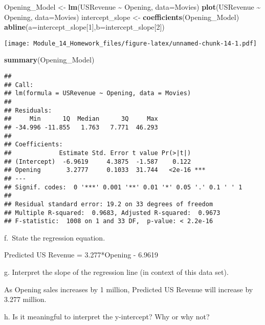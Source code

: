 \documentclass[
]{article}
\newenvironment{Shaded}{\begin{snugshade}}{\end{snugshade}}
\newcommand{\AttributeTok}[1]{\textcolor[rgb]{0.13,0.29,0.53}{#1}}
\newcommand{\DecValTok}[1]{\textcolor[rgb]{0.00,0.00,0.81}{#1}}
\newcommand{\FunctionTok}[1]{\textcolor[rgb]{0.13,0.29,0.53}{\textbf{#1}}}
\newcommand{\NormalTok}[1]{#1}
\newcommand{\OtherTok}[1]{\textcolor[rgb]{0.56,0.35,0.01}{#1}}
\newcommand{\SpecialCharTok}[1]{\textcolor[rgb]{0.81,0.36,0.00}{\textbf{#1}}}
\begin{document}
\begin{Shaded}
\begin{Highlighting}[]
\NormalTok{Opening\_Model }\OtherTok{\textless{}{-}} \FunctionTok{lm}\NormalTok{(USRevenue }\SpecialCharTok{\textasciitilde{}}\NormalTok{ Opening, }\AttributeTok{data=}\NormalTok{Movies)}
\FunctionTok{plot}\NormalTok{(USRevenue }\SpecialCharTok{\textasciitilde{}}\NormalTok{ Opening, }\AttributeTok{data=}\NormalTok{Movies)}
\NormalTok{intercept\_slope }\OtherTok{\textless{}{-}} \FunctionTok{coefficients}\NormalTok{(Opening\_Model)}
\FunctionTok{abline}\NormalTok{(}\AttributeTok{a=}\NormalTok{intercept\_slope[}\DecValTok{1}\NormalTok{],}\AttributeTok{b=}\NormalTok{intercept\_slope[}\DecValTok{2}\NormalTok{])}
\end{Highlighting}
\end{Shaded}

\texttt{[image: Module\_14\_Homework\_files/figure-latex/unnamed-chunk-14-1.pdf]}

\begin{Shaded}
\begin{Highlighting}[]
\FunctionTok{summary}\NormalTok{(Opening\_Model)}
\end{Highlighting}
\end{Shaded}

\begin{verbatim}
## 
## Call:
## lm(formula = USRevenue ~ Opening, data = Movies)
## 
## Residuals:
##     Min      1Q  Median      3Q     Max 
## -34.996 -11.855   1.763   7.771  46.293 
## 
## Coefficients:
##             Estimate Std. Error t value Pr(>|t|)    
## (Intercept)  -6.9619     4.3875  -1.587    0.122    
## Opening       3.2777     0.1033  31.744   <2e-16 ***
## ---
## Signif. codes:  0 '***' 0.001 '**' 0.01 '*' 0.05 '.' 0.1 ' ' 1
## 
## Residual standard error: 19.2 on 33 degrees of freedom
## Multiple R-squared:  0.9683, Adjusted R-squared:  0.9673 
## F-statistic:  1008 on 1 and 33 DF,  p-value: < 2.2e-16
\end{verbatim}

\hfill\break
f.~State the regression equation.

Predicted US Revenue = 3.277*Opening - 6.9619

\hfill\break
g. Interpret the slope of the regression line (in context of this data
set).

As Opening sales increases by 1 million, Predicted US Revenue will
increase by 3.277 million.

\hfill\break
h. Is it meaningful to interpret the y-intercept? Why or why not?
\end{document}
